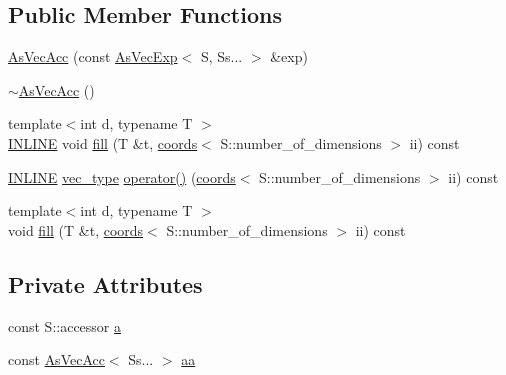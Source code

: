 \subsection*{Public Member Functions}
\begin{DoxyCompactItemize}
\item 
\hyperlink{classshark_1_1ndim_1_1_as_vec_acc_3_01_s_00_01_ss_8_8_8_01_4_a15a6a3519508753102c4e96694c9b15c}{As\+Vec\+Acc} (const \hyperlink{classshark_1_1ndim_1_1_as_vec_exp}{As\+Vec\+Exp}$<$ S, Ss... $>$ \&exp)
\item 
\hyperlink{classshark_1_1ndim_1_1_as_vec_acc_3_01_s_00_01_ss_8_8_8_01_4_ad56112a1ff4e5f4bfa1808fdb6e34e43}{$\sim$\+As\+Vec\+Acc} ()
\item 
{\footnotesize template$<$int d, typename T $>$ }\\\hyperlink{common_8hpp_a2eb6f9e0395b47b8d5e3eeae4fe0c116}{I\+N\+L\+I\+NE} void \hyperlink{classshark_1_1ndim_1_1_as_vec_acc_3_01_s_00_01_ss_8_8_8_01_4_a30fcd24dec4d442e2822838e1a5eec5b}{fill} (T \&t, \hyperlink{structshark_1_1ndim_1_1coords}{coords}$<$ S\+::number\+\_\+of\+\_\+dimensions $>$ ii) const
\item 
\hyperlink{common_8hpp_a2eb6f9e0395b47b8d5e3eeae4fe0c116}{I\+N\+L\+I\+NE} \hyperlink{classshark_1_1ndim_1_1_as_vec_acc_3_01_s_00_01_ss_8_8_8_01_4_acc514ee9d40c54ec227d44759ce80e34}{vec\+\_\+type} \hyperlink{classshark_1_1ndim_1_1_as_vec_acc_3_01_s_00_01_ss_8_8_8_01_4_acd05b5d259e16e6c9f87e298547d6243}{operator()} (\hyperlink{structshark_1_1ndim_1_1coords}{coords}$<$ S\+::number\+\_\+of\+\_\+dimensions $>$ ii) const
\item 
{\footnotesize template$<$int d, typename T $>$ }\\void \hyperlink{classshark_1_1ndim_1_1_as_vec_acc_3_01_s_00_01_ss_8_8_8_01_4_a36bb230f01a3a2b77156424f345429c9}{fill} (T \&t, \hyperlink{structshark_1_1ndim_1_1coords}{coords}$<$ S\+::number\+\_\+of\+\_\+dimensions $>$ ii) const
\end{DoxyCompactItemize}
\subsection*{Private Attributes}
\begin{DoxyCompactItemize}
\item 
const S\+::accessor \hyperlink{classshark_1_1ndim_1_1_as_vec_acc_3_01_s_00_01_ss_8_8_8_01_4_aa23d501c29acbde8ff8d9e2c72bb4756}{a}
\item 
const \hyperlink{classshark_1_1ndim_1_1_as_vec_acc}{As\+Vec\+Acc}$<$ Ss... $>$ \hyperlink{classshark_1_1ndim_1_1_as_vec_acc_3_01_s_00_01_ss_8_8_8_01_4_ab43adccf8b6c612647ae7a9986dad9e2}{aa}
\end{DoxyCompactItemize}


